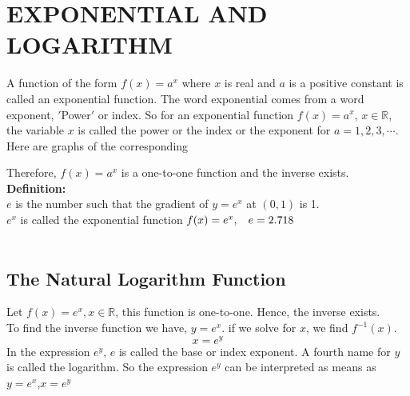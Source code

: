 \documentclass[11pt,a4paper]{article}
\begin{document}
\pagebreak
\section{EXPONENTIAL AND LOGARITHM}

A function of the form $f(x)=a^x$ where $x$ is real and $a$ is a positive constant is called an exponential function. The word exponential comes from a word exponent, $'$Power$'$ or index. So for an exponential function $f(x)=a^x$, $x\in \mathbb{R}$, the variable $x$ is called the power or the index or the exponent for $a=1,2,3,\cdots$.\\

Here are graphs of the corresponding\\


\begin{figure}[H]
\centering
{}
\end{figure} 

Therefore, $f(x)=a^x$ is a one-to-one function and the inverse exists.\\

\textbf{Definition:}\\
$e$ is the number such that the gradient of $y=e^x$ at $(0,1)$ is 1.\\

$e^x$ is called the exponential function $f(x)=e^x,\hspace{0.3cm} e=2.718$\\\\










\subsection{The Natural Logarithm Function}

Let $f(x)=e^x, x\in \mathbb{R}$, this function is one-to-one. Hence, the inverse exists.\\
To find the inverse function we have, $y=e^x$. if we solve for $x$, we find $f^{-1}(x)$. $$x=e^y$$
In the expression $e^y$, $e$ is called the base or index exponent. A fourth name for $y$ is called the logarithm. So the expression $e^y$ can be interpreted as means as $y=e^x$,$x=e^y$\\\\
\end{document}
